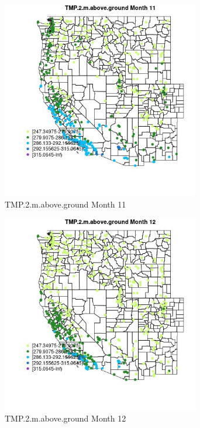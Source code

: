 \begin{figure} 
\centering  
\includegraphics[width=0.77\textwidth]{Code_Outputs/Report_ML_input_PM25_Step4_part_e_de_duplicated_aves_compiled_2019-05-14wNAs_MapObsMo11TMP2maboveground.jpg} 
\caption{\label{fig:Report_ML_input_PM25_Step4_part_e_de_duplicated_aves_compiled_2019-05-14wNAsMapObsMo11TMP2maboveground}TMP.2.m.above.ground Month 11} 
\end{figure} 
 

\begin{figure} 
\centering  
\includegraphics[width=0.77\textwidth]{Code_Outputs/Report_ML_input_PM25_Step4_part_e_de_duplicated_aves_compiled_2019-05-14wNAs_MapObsMo12TMP2maboveground.jpg} 
\caption{\label{fig:Report_ML_input_PM25_Step4_part_e_de_duplicated_aves_compiled_2019-05-14wNAsMapObsMo12TMP2maboveground}TMP.2.m.above.ground Month 12} 
\end{figure} 
 


